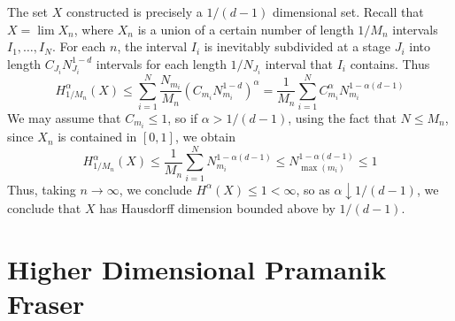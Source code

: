 \begin{remark}
    The set $X$ constructed is precisely a $1/(d-1)$ dimensional set. Recall that $X = \lim X_n$, where $X_n$ is a union of a certain number of length $1/M_n$ intervals $I_1, \dots, I_N$. For each $n$, the interval $I_i$ is inevitably subdivided at a stage $J_i$ into length $C_{J_i} N_{J_i}^{1-d}$ intervals for each length $1/N_{J_i}$ interval that $I_i$ contains. Thus
    \[ H_{1/M_n}^\alpha(X) \leq \sum_{i = 1}^N \frac{N_{m_i}}{M_n} (C_{m_i} N_{m_i}^{1-d})^\alpha = \frac{1}{M_n} \sum_{i = 1}^N C_{m_i}^\alpha N_{m_i}^{1 - \alpha(d-1)} \]
    We may assume that $C_{m_i} \leq 1$, so if $\alpha > 1/(d - 1)$, using the fact that $N \leq M_n$, since $X_n$ is contained in $[0,1]$, we obtain
    \[ H_{1/M_n}^\alpha(X) \leq \frac{1}{M_n} \sum_{i = 1}^N N_{m_i}^{1 - \alpha(d-1)} \leq N_{\max(m_i)}^{1 - \alpha(d-1)} \leq 1 \]
    Thus, taking $n \to \infty$, we conclude $H^\alpha(X) \leq 1 < \infty$, so as $\alpha \downarrow 1/(d - 1)$, we conclude that $X$ has Hausdorff dimension bounded above by $1/(d-1)$.
\end{remark}

\section{Higher Dimensional Pramanik Fraser}

